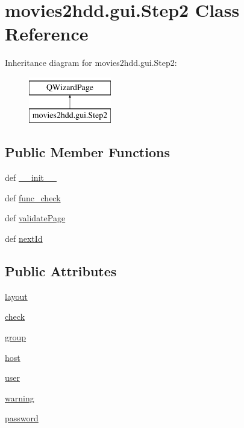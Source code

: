 \hypertarget{classmovies2hdd_1_1gui_1_1_step2}{\section{movies2hdd.\-gui.\-Step2 Class Reference}
\label{classmovies2hdd_1_1gui_1_1_step2}
}
Inheritance diagram for movies2hdd.\-gui.\-Step2\-:\begin{figure}[H]
\begin{center}
\leavevmode
\includegraphics[height=2.000000cm]{classmovies2hdd_1_1gui_1_1_step2}
\end{center}
\end{figure}
\subsection*{Public Member Functions}
\begin{DoxyCompactItemize}
\item 
def \hyperlink{classmovies2hdd_1_1gui_1_1_step2_adbcd30dbde1136bd162a892ee16f6584}{\-\_\-\-\_\-init\-\_\-\-\_\-}
\item 
def \hyperlink{classmovies2hdd_1_1gui_1_1_step2_a9edb6b6d3a228791366c2003c7b17edf}{func\-\_\-check}
\item 
def \hyperlink{classmovies2hdd_1_1gui_1_1_step2_a5c46ff531c08753f9dca56f3e15717c0}{validate\-Page}
\item 
def \hyperlink{classmovies2hdd_1_1gui_1_1_step2_a9c39ae8418c352068f6248843eefe1f5}{next\-Id}
\end{DoxyCompactItemize}
\subsection*{Public Attributes}
\begin{DoxyCompactItemize}
\item 
\hyperlink{classmovies2hdd_1_1gui_1_1_step2_a0a18ea7d6f2a66251b60d74b8af0696b}{layout}
\item 
\hyperlink{classmovies2hdd_1_1gui_1_1_step2_af460b9a80cc6f30892480537debd47f9}{check}
\item 
\hyperlink{classmovies2hdd_1_1gui_1_1_step2_ac4656ee08d1176420516f83a856b0799}{group}
\item 
\hyperlink{classmovies2hdd_1_1gui_1_1_step2_a683a7687252c2018725e11630076d804}{host}
\item 
\hyperlink{classmovies2hdd_1_1gui_1_1_step2_a18455a364c4876707a596f250568abce}{user}
\item 
\hyperlink{classmovies2hdd_1_1gui_1_1_step2_a87c68120beaf76279360a47159d5c7aa}{warning}
\item 
\hyperlink{classmovies2hdd_1_1gui_1_1_step2_a3f46e0dc9e59cbc475fb08f1ab5c96e0}{password}
\end{DoxyCompactItemize}


